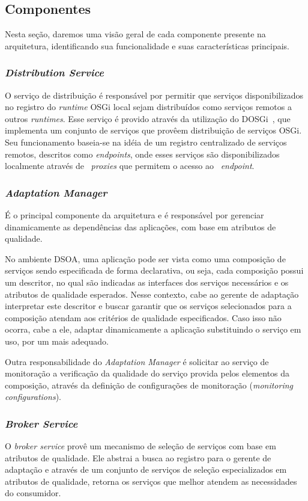 \subsection{Componentes}
Nesta seção, daremos uma visão geral de cada componente presente na arquitetura, identificando sua funcionalidade e suas características principais.

\subsubsection{\textit{Distribution Service}}
\label{subsub:dosgi}
O serviço de distribuição é responsável por permitir que serviços disponibilizados no registro do \textit{runtime} OSGi local sejam distribuídos como serviços remotos a outros \textit{runtimes}. Esse serviço é provido através da utilização do DOSGi~\cite{dosgi}, que implementa um conjunto de serviços que provêem distribuição de serviços OSGi. Seu funcionamento baseia-se na idéia de um registro centralizado de serviços remotos, descritos como \textit{endpoints}, onde esses serviços são disponibilizados localmente através de ~\textit{proxies} que permitem o acesso ao ~\textit{endpoint}.

\subsubsection{\textit{Adaptation Manager}}

É o principal componente da arquitetura e é responsável por gerenciar dinamicamente as dependências das aplicações, com base em atributos de qualidade. 

No ambiente DSOA, uma aplicação pode ser vista como uma composição de serviços sendo especificada de forma declarativa, ou seja, cada composição possui um descritor, no qual são indicadas as interfaces dos serviços necessários e os atributos de qualidade esperados. Nesse contexto, cabe ao gerente de adaptação interpretar este descritor e buscar garantir que os serviços selecionados para a composição atendam aos critérios de qualidade especificados. Caso isso não ocorra, cabe a ele, adaptar dinamicamente a aplicação substituindo o serviço em uso, por um mais adequado.

Outra responsabilidade do \textit{Adaptation Manager} é solicitar ao serviço de monitoração a verificação da qualidade do serviço provida pelos elementos da composição, através da definição de configurações de monitoração (\textit{monitoring configurations}).

\subsubsection{\textit{Broker Service}}
O \textit{broker service}  provê um mecanismo de seleção de serviços com base em atributos de qualidade. Ele abstrai a busca ao registro para o gerente de adaptação e através de um conjunto de serviços de seleção especializados em atributos de qualidade, retorna os serviços que melhor atendem as necessidades do consumidor.

